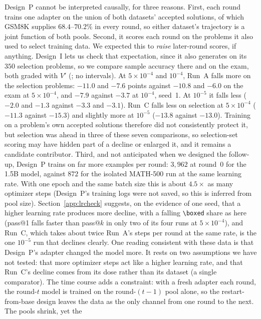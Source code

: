 \documentclass[runningheads]{llncs}
\begin{document}
Design~P cannot be interpreted causally, for three reasons. First, each round
trains one adapter on the union of both datasets' accepted solutions, of which
GSM8K supplies $68.4$--$70.2\%$ in every round, so either dataset's trajectory is
a joint function of both pools. Second, it scores each round on the problems it
also used to select training data. We expected this to \emph{raise} later-round
scores, if anything. Design~I lets us check that expectation, since it also
generates on its $350$ selection problems, so we compare sample accuracy there
and on the exam, both graded with $V'$
(; no intervals). At
$5\times10^{-4}$ and $10^{-4}$, Run~A falls more on the selection problems:
$-11.0$ and $-7.6$ points against $-10.8$ and $-6.0$ on the exam at
$5\times10^{-4}$, and $-7.9$ against $-3.7$ at $10^{-4}$, seed~1. At $10^{-5}$ it
falls less ($-2.0$ and $-1.3$ against $-3.3$ and $-3.1$). Run~C falls less on
selection at $5\times10^{-4}$ ($-11.3$ against $-15.3$) and slightly more at
$10^{-5}$ ($-13.8$ against $-13.0$). Training on a problem's own accepted
solutions therefore did not consistently protect it, but selection was ahead in
three of these seven comparisons, so selection-set scoring may have hidden part
of a decline or enlarged it, and it remains a candidate contributor. Third, and not anticipated when we designed the follow-up, Design~P
trains on far more examples per round: $3{,}962$ at round~0 for the 1.5B model,
against $872$ for the isolated MATH-500 run at the same learning rate. With one
epoch and the same batch size this is about $4.5\times$ as many optimizer steps
(Design~P's training logs were not saved, so this is inferred from pool size).
Section~\ref{app:lrcheck} suggests, on the evidence of one seed, that a higher
learning rate produces more decline, with a falling \verb|\boxed| share as here
(pass@1 falls faster than pass@$k$ in only two of its four runs at
$5\times10^{-4}$), and Run~C, which takes about twice Run~A's steps per round
at the same rate, is the one $10^{-5}$ run that declines clearly. One reading
consistent with these data is that Design~P's adapter changed the model more.
It rests on two assumptions we have not tested: that more optimizer steps act
like a higher learning rate, and that Run~C's decline comes from its dose
rather than its dataset (a single comparator). The time course adds a
constraint: with a fresh adapter each round, the round-$t$ model is trained on
the round-$(t-1)$ pool alone, so the restart-from-base design leaves the data
as the only channel from one round to the next. The pools shrink, yet the
\end{document}
